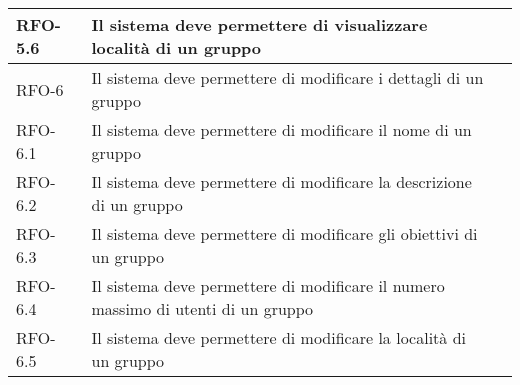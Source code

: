 \begin{center}
{\begin{longtable}{
      |>{\centering\arraybackslash}p{60pt}
      |>{\centering\arraybackslash}p{220pt}
      |>{\centering\arraybackslash}p{60pt}|}
      RFO-5.6                                                              & Il
      sistema deve permettere di visualizzare  località di
      un gruppo                                                            &
      \nameref{sub:visualizzazione-località-gruppo}                             \\
      \hline

      RFO-6                                                                & Il
      sistema deve permettere di modificare i dettagli di un
      gruppo                                                               &
      \nameref{uc:scenario-modifica-gruppo}                                     \\
      \hline

      RFO-6.1                                                              & Il
      sistema deve permettere di modificare il nome di un
      gruppo                                                               &
      \nameref{sub:modifica-nome-gruppo}                                        \\
      \hline

      RFO-6.2                                                              & Il
      sistema deve permettere di modificare la descrizione
      di un gruppo                                                         &
      \nameref{sub:modifica-descrizione-gruppo}                                 \\
      \hline

      RFO-6.3                                                              & Il
      sistema deve permettere di modificare gli obiettivi
      di un gruppo                                                         &
      \nameref{sub:modifica-obiettivi-gruppo}                                   \\
      \hline

      RFO-6.4                                                              & Il
      sistema deve permettere di modificare il numero
      massimo di utenti di un gruppo                                       &
      \nameref{sub:modifica-numero-utenti-gruppo}                               \\
      \hline

      RFO-6.5                                                              & Il
      sistema deve permettere di modificare la località di
      un gruppo                                                            &
      \nameref{sub:modifica-località-gruppo}                                    \\
      \hline


\end{longtable}}
\end{center}
